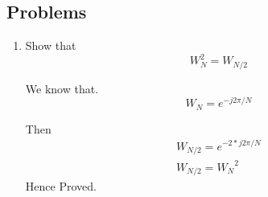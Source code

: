\documentclass[journal,12pt,twocolumn]{IEEEtran}
\renewcommand\thesection{\arabic{section}}
\begin{document}
\subsection{Problems}
\begin{enumerate}[label=\arabic*.,ref=\thesection.\theenumi]
	\item Show that 
	\begin{equation}
		W_{N}^{2}=W_{N/2}
	\end{equation}
	
	\solution We know that.
	\begin{equation}
		W_{N} = e^{-j2\pi/N} 
	\end{equation}
	
	Then 
	\begin{align}
		W_{N/2} = e^{-2*j2\pi/N} \\
		W_{N/2} = {W_{N}}^{2}
	\end{align}
	Hence Proved.
	

\end{enumerate}
\end{document}

